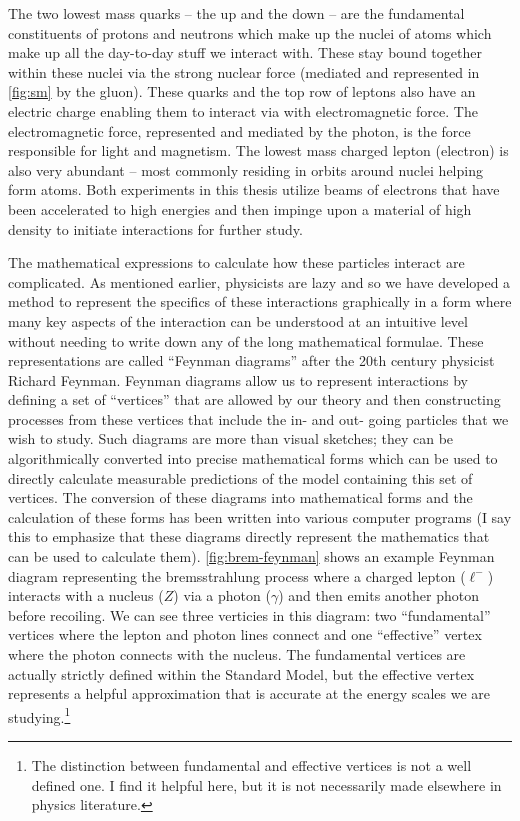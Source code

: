 The two lowest mass quarks -- the up and the down -- are the fundamental constituents of protons
and neutrons which make up the nuclei of atoms which make up all the day-to-day stuff we interact
with. These stay bound together within these nuclei via the strong nuclear force (mediated and
represented in \cref{fig:sm} by the gluon). These quarks and the top row of leptons also have an
electric charge enabling them to interact via with electromagnetic force. The electromagnetic
force, represented and mediated by the photon, is the force responsible for light and magnetism.
The lowest mass charged lepton (electron) is also very abundant -- most commonly residing in orbits
around nuclei helping form atoms. Both experiments in this thesis utilize beams of electrons that
have been accelerated to high energies and then impinge upon a material of high density to initiate
interactions for further study.

The mathematical expressions to calculate how these particles interact are complicated. As
mentioned earlier, physicists are lazy and so we have developed a method to represent the specifics
of these interactions graphically in a form where many key aspects of the interaction can be
understood at an intuitive level without needing to write down any of the long mathematical
formulae. These representations are called ``Feynman diagrams'' after the 20th century physicist
Richard Feynman. Feynman diagrams allow us to represent interactions by defining a set of
``vertices'' that are allowed by our theory and then constructing processes from these vertices
that include the in- and out- going particles that we wish to study. Such diagrams are more than
visual sketches; they can be algorithmically converted into precise mathematical forms which can be
used to directly calculate measurable predictions of the model containing this set of vertices. The
conversion of these diagrams into mathematical forms and the calculation of these forms has been
written into various computer programs (I say this to emphasize that these diagrams directly
represent the mathematics that can be used to calculate them). \cref{fig:brem-feynman} shows an
example Feynman diagram representing the bremsstrahlung process where a charged lepton (\(\ell^-\))
interacts with a nucleus (\(Z\)) via a photon (\(\gamma\)) and then emits another photon before
recoiling. We can see three verticies in this diagram: two ``fundamental'' vertices where the
lepton and photon lines connect and one ``effective'' vertex where the photon connects with the
nucleus. The fundamental vertices are actually strictly defined within the Standard Model, but the
effective vertex represents a helpful approximation that is accurate at the energy scales we are
studying.\footnote{
  The distinction between fundamental and effective vertices is not a well
  defined one. I find it helpful here, but it is not necessarily made elsewhere in physics
  literature.
}

